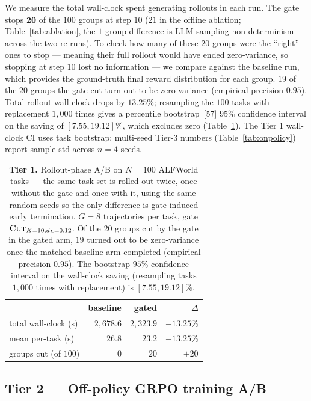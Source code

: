 \documentclass{article}
\begin{document}
We measure the total wall-clock spent generating rollouts in
each run. The gate stops $\mathbf{20}$ of the $100$ groups at
step $10$ ($21$ in the offline ablation;
Table~\ref{tab:ablation}, the $1$-group difference is LLM
sampling non-determinism across the two re-runs). To check how many of these $20$ groups were the
``right'' ones to stop --- meaning their full rollout would have
ended zero-variance, so stopping at step $10$ lost no
information --- we compare against the baseline run, which
provides the ground-truth final reward distribution for each
group. $19$ of the $20$ groups the gate cut turn out to be
zero-variance (empirical precision $0.95$). Total rollout
wall-clock drops by $\mathbf{13.25\%}$; resampling the $100$
tasks with replacement $1{,}000$ times gives a percentile
bootstrap~[57] $95\%$ confidence interval on the saving of
$[7.55, 19.12]\%$, which excludes zero
(Table~\ref{tab:wallclock}). The Tier 1 wall-clock CI uses task
bootstrap; multi-seed Tier-3 numbers
(Table~\ref{tab:onpolicy}) report sample std across $n\!=\!4$
seeds.

\begin{table}[h]
\centering
\caption{\textbf{Tier 1.} Rollout-phase A/B on $N\!=\!100$
ALFWorld tasks --- the same task set is rolled out twice, once
without the gate and once with it, using the same random seeds
so the only difference is gate-induced early termination.
$G\!=\!8$ trajectories per task, gate
$\textsc{Cut}_{K=10, d_L=0.12}$. Of the $20$ groups cut by the
gate in the gated arm, $19$ turned out to be zero-variance once
the matched baseline arm completed (empirical precision $0.95$).
The bootstrap $95\%$ confidence interval on the wall-clock
saving (resampling tasks $1{,}000$ times with replacement) is
$[7.55, 19.12]\%$.}
\label{tab:wallclock}
\small
\begin{tabular}{lrrr}
\toprule
& baseline & gated & $\Delta$ \\
\midrule
total wall-clock (s)        & $2{,}678.6$ & $2{,}323.9$ & $\mathbf{-13.25\%}$ \\
mean per-task (s)           & $26.8$      & $23.2$      & $-13.25\%$ \\
groups cut (of $100$)       & $0$         & $20$        & $+20$ \\
\bottomrule
\end{tabular}
\end{table}

\subsection{Tier 2 — Off-policy GRPO training A/B}
\label{sec:offpolicy}
\end{document}
